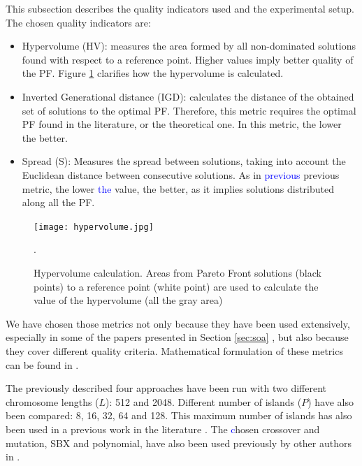\documentclass[preprint]{elsarticle}
\begin{document}
This subsection describes the quality indicators used and the experimental setup. The chosen quality indicators are:

\begin{itemize}
\item Hypervolume (HV): measures the area formed by all non-dominated solutions found with respect to a reference point. Higher values imply better quality of the PF. Figure \ref{fig:hypervolume} clarifies how the hypervolume is calculated.
\item Inverted Generational distance (IGD): calculates the distance of the obtained set of solutions to the optimal PF. Therefore, this metric requires the optimal PF found in the literature, or the theoretical one. In this metric, the lower the better. %
\item Spread (S): Measures the spread between solutions, taking into account the Euclidean distance between consecutive solutions. As in \textcolor{blue}{previous} previous metric, the lower \textcolor{blue}{the} value, the better, as it implies solutions distributed along all the PF.
\end{itemize}

\begin{figure}
\centering
\texttt{[image: hypervolume.jpg]}
\caption{Hypervolume calculation. Areas from Pareto Front solutions (black points) to a reference point (white point) are used to calculate the value of the hypervolume (all the gray area)}.
\label{fig:hypervolume}
\end{figure}


We have chosen those metrics not only because they have been used
extensively, especially in some of the papers presented in Section \ref{sec:soa}
\cite{Dorronsoro13superlinear,Durillo08masterslave,Hiroyasu07discussion,Wang09parallel,Martens13asynchronous},
but also because they cover different quality criteria. Mathematical
formulation of these metrics can be found in
\cite{Dorronsoro13superlinear}. 



The previously described four approaches have been run with two
different chromosome lengths ($L$): 512 and 2048. Different number of
islands ($P$) have also been compared: 8, 16, 32, 64 and 128. This
maximum number of islands has also been  used in a previous work in the
literature \cite{Martens13asynchronous}. The \textcolor{blue} chosen crossover and mutation, SBX and polynomial, have also been  used previously by other
authors in \cite{Durillo08masterslave,CaoZLL17}.  %
\end{document}
